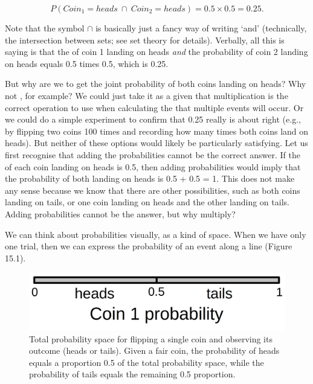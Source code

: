\documentclass[
  openany]{krantz}
\begin{document}
\[P(Coin_{1} = heads\:\cap\:Coin_{2} = heads) = 0.5 \times 0.5 = 0.25.\]

Note that the symbol \(\cap\) is basically just a fancy way of writing `and' (technically, the intersection between sets; see set theory for details).
Verbally, all this is saying is that the  of coin 1 landing on heads \emph{and} the probability of coin 2 landing on heads equals 0.5 times 0.5, which is 0.25.

But why are we \emph{} to get the joint probability of both coins landing on heads?
Why not , for example?
We could just take it as a given that multiplication is the correct operation to use when calculating the  that multiple events will occur.
Or we could do a simple experiment to confirm that 0.25 really is about right (e.g., by flipping two coins 100 times and recording how many times both coins land on heads).
But neither of these options would likely be particularly satisfying.
Let us first recognise that adding the probabilities cannot be the correct answer.
If the  of each coin landing on heads is 0.5, then adding probabilities would imply that the probability of both landing on heads is 0.5 + 0.5 = 1.
This does not make any sense because we know that there are other possibilities, such as both coins landing on tails, or one coin landing on heads and the other landing on tails.
Adding probabilities cannot be the answer, but why multiply?

We can think about probabilities visually, as a kind of  space.
When we have only one trial, then we can express the probability of an event along a line (Figure 15.1).

\begin{figure}
\includegraphics[width=1\linewidth]{img/coin1_probability} \caption{Total probability space for flipping a single coin and observing its outcome (heads or tails). Given a fair coin, the probability of heads equals a proportion 0.5 of the total probability space, while the probability of tails equals the remaining 0.5 proportion.}\label{fig:unnamed-chunk-50}
\end{figure}
\end{document}
